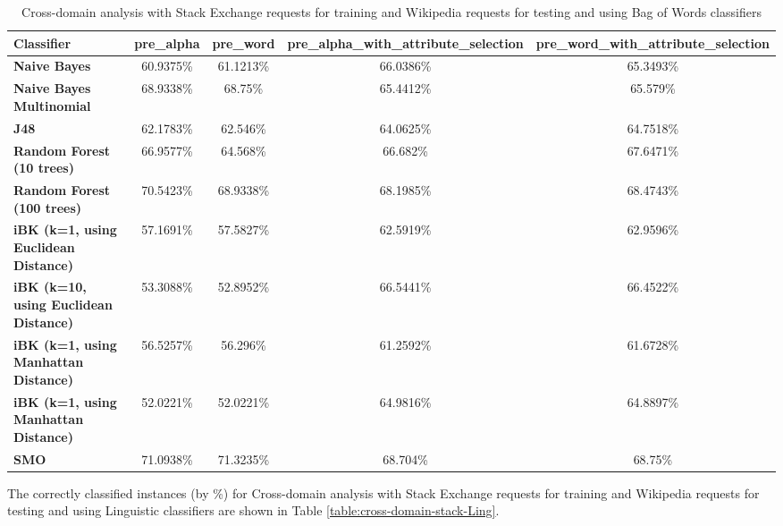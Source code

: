 \documentclass[conference]{IEEEtran}
\begin{document}
\begin{table*}[htbp]
\caption{Cross-domain analysis with Stack Exchange requests for training and Wikipedia requests for testing and using Bag of Words classifiers}
\centering
\vspace{5pt}
\begin{tabular}{|l|c|c|c|c|}
\hline
\textbf{Classifier} & \textbf{pre\_alpha} & \textbf{pre\_word} & \textbf{pre\_alpha\_with\_attribute\_selection} & \textbf{pre\_word\_with\_attribute\_selection} \\
\hline\hline
\textbf{Naive Bayes} & 60.9375\% & 61.1213\% & 66.0386\% & 65.3493\% \\ 
\hline
\textbf{Naive Bayes Multinomial} & 68.9338\% & 68.75\% & 65.4412\% & 65.579\% \\ 
\hline
\textbf{J48} & 62.1783\% & 62.546\% & 64.0625\% & 64.7518\% \\ 
\hline
\textbf{Random Forest (10 trees)} & 66.9577\% & 64.568\% & 66.682\% & 67.6471\% \\ 
\hline
\textbf{Random Forest (100 trees)} & 70.5423\% & 68.9338\% & 68.1985\% & 68.4743\% \\ 
\hline
\textbf{iBK (k=1, using Euclidean Distance)} & 57.1691\% & 57.5827\% & 62.5919\% & 62.9596\% \\ 
\hline
\textbf{iBK (k=10, using Euclidean Distance)} & 53.3088\% & 52.8952\% & 66.5441\% & 66.4522\% \\ 
\hline
\textbf{iBK (k=1, using Manhattan Distance)} & 56.5257\% & 56.296\% & 61.2592\% & 61.6728\% \\ 
\hline
\textbf{iBK (k=1, using Manhattan Distance)} & 52.0221\% & 52.0221\% & 64.9816\% & 64.8897\% \\ 
\hline
\textbf{SMO} & 71.0938\% & 71.3235\% & 68.704\% & 68.75\% \\ 
\hline
\hline
\end{tabular}
\label{table:cross-domain-stack-BOW}
\end{table*}

The correctly classified instances (by \%) for Cross-domain analysis with Stack Exchange requests for training and Wikipedia requests for testing and using Linguistic classifiers are shown in Table \ref{table:cross-domain-stack-Ling}.
\end{document}
